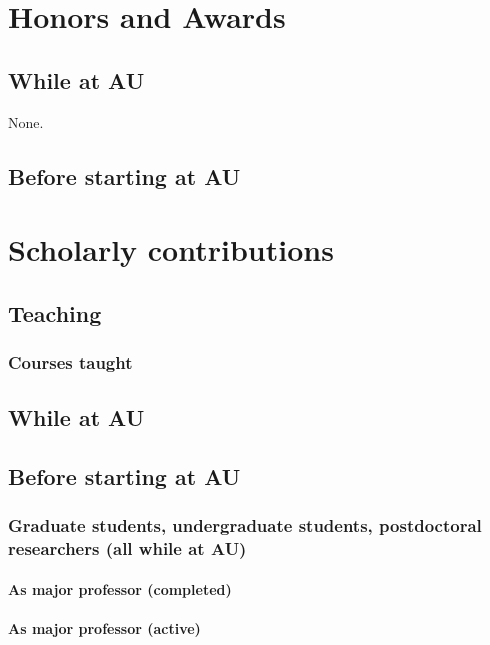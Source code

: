 \section{Honors and Awards}
\subsection*{While at AU}
None.

\subsection*{Before starting at AU}



\section{Scholarly contributions}

\subsection{Teaching}

\subsubsection{Courses taught}

\subsection*{While at AU}


\subsection*{Before starting at AU}


\subsubsection{Graduate students, undergraduate students, postdoctoral researchers (all while at AU)}

\paragraph*{As major professor (completed)}



\paragraph*{As major professor (active)}

